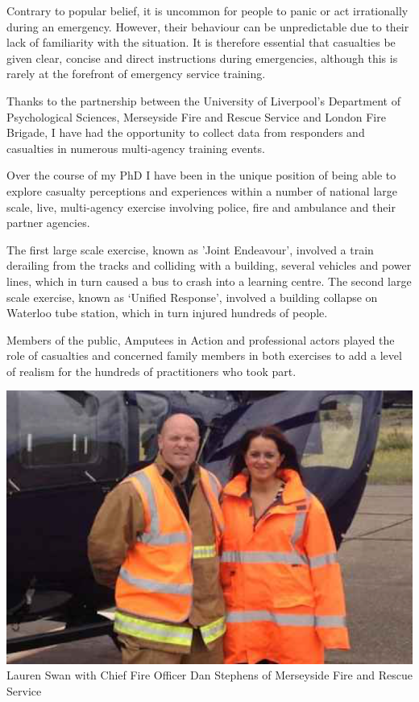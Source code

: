 \documentclass[11pt]{article}%
\begin{document}
\begin{minipage}{.75\linewidth}
\begin{multicols}{2} %
Contrary to popular belief, it is uncommon for people to panic or act irrationally during an emergency. However, their behaviour can be unpredictable due to their lack of familiarity with the situation. It is therefore essential that casualties be given clear, concise and direct instructions during emergencies, although this is rarely at the forefront of emergency service training.

Thanks to the partnership between the University of Liverpool’s Department of Psychological Sciences, Merseyside Fire and Rescue Service and London Fire Brigade, I have had the opportunity to collect data from responders and casualties in numerous multi-agency training events.

Over the course of my PhD I have been in the unique position of being able to explore casualty perceptions and experiences within a number of national large scale, live, multi-agency exercise involving police, fire and ambulance and their partner agencies.

The first large scale exercise, known as 'Joint Endeavour', involved a train derailing from the tracks and colliding with a building, several vehicles and power lines, which in turn caused a bus to crash into a learning centre. The second large scale exercise, known as ‘Unified Response’, involved a building collapse on Waterloo tube station, which in turn injured hundreds of people. 

Members of the public, Amputees in Action and professional actors played the role of casualties and concerned family members in both exercises to add a level of realism for the  hundreds of practitioners who took part.

\includegraphics[width=0.5 \textwidth]{lauren/laurenFireRescue.png}\\
{\scriptsize Lauren Swan with Chief Fire Officer Dan Stephens of Merseyside Fire and Rescue Service}



\end{multicols}
\end{minipage}
\end{document}
